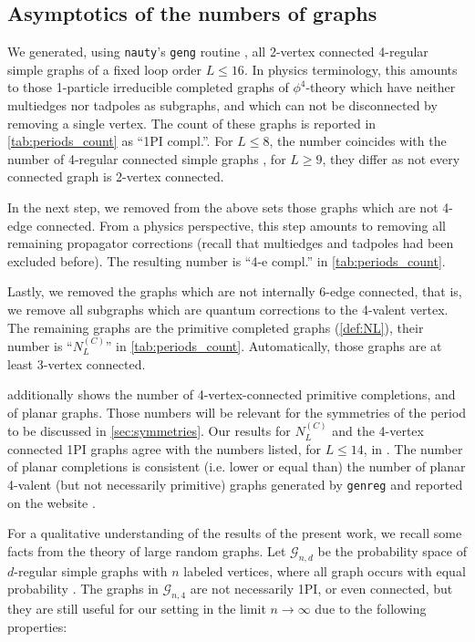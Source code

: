 \documentclass[12pt,a4paper]{article}
\renewcommand{\|}{\rule[-0.4ex]{0.2ex}{1.2em}}
\begin{document}
\subsection{Asymptotics of the numbers of graphs}\label{sec:asymptotics}



We generated, using \texttt{nauty}'s \texttt{geng} routine \cite{mckay_practical_2014}, all 2-vertex connected 4-regular simple graphs of a fixed loop order $L \leq 16$. In physics terminology, this amounts to those 1-particle irreducible completed graphs of $\phi^4$-theory which have neither multiedges   nor  tadpoles as subgraphs, and which can not be disconnected by removing a single vertex. The count of these graphs is reported in \cref{tab:periods_count} as \enquote{1PI compl.}. For $L\leq 8$, the number coincides with the number of 4-regular connected  simple graphs \cite[A006820]{oeis}, for $L \geq 9$, they differ as not every connected graph is 2-vertex connected. 

In the next step, we removed from the above sets  those graphs which are not 4-edge connected. From a physics perspective, this step amounts to removing all remaining propagator corrections (recall that multiedges and tadpoles had been excluded before). The resulting number is \enquote{4-e compl.} in \cref{tab:periods_count}.

Lastly, we removed the graphs which are not internally 6-edge connected, that is, we remove all subgraphs which are quantum corrections to the 4-valent vertex. The remaining graphs are the primitive completed graphs  (\cref{def:NL}), their number is \enquote{$N^{(C)}_L$} in \cref{tab:periods_count}. Automatically, those graphs are at least 3-vertex connected.


 additionally shows the number of 4-vertex-connected primitive completions, and of planar graphs. Those numbers will be relevant for the symmetries of the period to be discussed in \cref{sec:symmetries}. Our results for $N^{(C)}_L$ and the 4-vertex connected 1PI graphs agree with the numbers listed, for $L\leq 14$, in \cite{schnetz_quantum_2010}.
The number of planar completions is consistent (i.e. lower or equal than) the number of planar 4-valent (but not necessarily primitive) graphs generated by \texttt{genreg} \cite{meringer_fast_1999} and reported on the website \cite{meringer_regular_2009}.





For a qualitative understanding of the results of the present work, we recall some facts from the theory of large random graphs. Let $\mathcal{G}_{n,d}$ be the probability space of $d$-regular  simple graphs  with $n$ labeled vertices, where all graph occurs with equal probability \cite{wormald_models_1999,bollobas_random_2001,bollobas_modern_1998}. The graphs in $\mathcal{G}_{n,4}$ are not necessarily 1PI, or even connected,  but they are still useful for our setting in the limit $n \rightarrow \infty$ due to the following properties:
\end{document}
